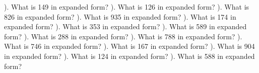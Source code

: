 \documentclass{article}%
\begin{document}
). What is 149 in expanded form?%
\newline%
\newline%
). What is 126 in expanded form?%
\newline%
\newline%
). What is 826 in expanded form?%
\newline%
\newline%
). What is 935 in expanded form?%
\newline%
\newline%
). What is 174 in expanded form?%
\newline%
\newline%
). What is 353 in expanded form?%
\newline%
\newline%
). What is 589 in expanded form?%
\newline%
\newline%
). What is 288 in expanded form?%
\newline%
\newline%
). What is 788 in expanded form?%
\newline%
\newline%
). What is 746 in expanded form?%
\newline%
\newline%
). What is 167 in expanded form?%
\newline%
\newline%
). What is 904 in expanded form?%
\newline%
\newline%
). What is 124 in expanded form?%
\newline%
\newline%
). What is 588 in expanded form?%
\newline%
\newline%
\end{document}
